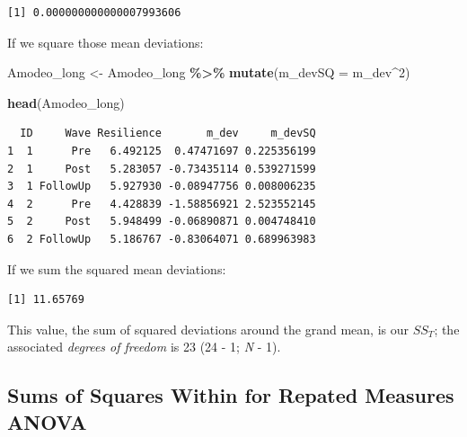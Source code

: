 \documentclass[
  11pt,
]{book}
\newenvironment{Shaded}{\begin{snugshade}}{\end{snugshade}}
\newcommand{\AttributeTok}[1]{\textcolor[rgb]{0.27,0.27,0.27}{#1}}
\newcommand{\DecValTok}[1]{\textcolor[rgb]{0.06,0.06,0.06}{#1}}
\newcommand{\FunctionTok}[1]{\textcolor[rgb]{0.27,0.27,0.27}{\textbf{#1}}}
\newcommand{\NormalTok}[1]{#1}
\newcommand{\OtherTok}[1]{\textcolor[rgb]{0.37,0.37,0.37}{#1}}
\newcommand{\SpecialCharTok}[1]{\textcolor[rgb]{0.43,0.43,0.43}{\textbf{#1}}}
\begin{document}
\begin{Shaded}
\end{Shaded}

\begin{verbatim}
[1] 0.000000000000007993606
\end{verbatim}

If we square those mean deviations:

\begin{Shaded}
\begin{Highlighting}[]
\NormalTok{Amodeo\_long }\OtherTok{\textless{}{-}}\NormalTok{ Amodeo\_long }\SpecialCharTok{\%\textgreater{}\%} 
  \FunctionTok{mutate}\NormalTok{(}\AttributeTok{m\_devSQ =}\NormalTok{ m\_dev}\SpecialCharTok{\^{}}\DecValTok{2}\NormalTok{)}

\FunctionTok{head}\NormalTok{(Amodeo\_long)}
\end{Highlighting}
\end{Shaded}

\begin{verbatim}
  ID     Wave Resilience       m_dev     m_devSQ
1  1      Pre   6.492125  0.47471697 0.225356199
2  1     Post   5.283057 -0.73435114 0.539271599
3  1 FollowUp   5.927930 -0.08947756 0.008006235
4  2      Pre   4.428839 -1.58856921 2.523552145
5  2     Post   5.948499 -0.06890871 0.004748410
6  2 FollowUp   5.186767 -0.83064071 0.689963983
\end{verbatim}

If we sum the squared mean deviations:

\begin{Shaded}
\end{Shaded}

\begin{verbatim}
[1] 11.65769
\end{verbatim}

This value, the sum of squared deviations around the grand mean, is our \(SS_T\); the associated \emph{degrees of freedom} is 23 (24 - 1; \emph{N} - 1).

\hypertarget{sums-of-squares-within-for-repated-measures-anova}{%
\subsection{Sums of Squares Within for Repated Measures ANOVA}\label{sums-of-squares-within-for-repated-measures-anova}}
\end{document}
